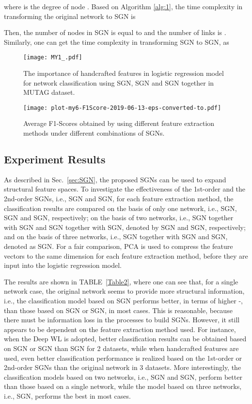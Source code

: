 \documentclass[10pt,journal,compsoc]{IEEEtran}
\begin{document}
where  is the degree of node . Based on Algorithm \ref{alg:1}, the time complexity in transforming the original network to SGN is

Then, the number of nodes in SGN is equal to  and the number of links is  \cite{harary1960some}. Similarly, one can get the time complexity in transforming SGN to SGN, as


\begin{figure*}[!t]
  \centering
  \texttt{[image: MY1\_.pdf]}
  \caption{The importance of handcrafted features in logistic regression model for network classification using SGN, SGN and SGN together in MUTAG dataset.}
  \label{featureout}
\end{figure*}

\begin{figure*}[!t]
  \centering
  \texttt{[image: plot-my6-F1Score-2019-06-13-eps-converted-to.pdf]}
  \caption{Average F1-Scores obtained by using different feature extraction methods under different combinations of SGNs.}
  \label{fig:exps}
\end{figure*}


\subsection{Experiment Results}
As described in Sec.~\ref{sec:SGN}, the proposed SGNs can be used to expand structural feature spaces. To investigate the effectiveness of the 1st-order and the 2nd-order SGNs, i.e., SGN and SGN, for each feature extraction method, the classification results are compared on the basis of only one network, i.e., SGN, SGN and SGN, respectively; on the basis of two networks, i.e., SGN together with SGN and SGN together with SGN, denoted by SGN and SGN, respectively; and on the basis of three networks, i.e., SGN together with SGN and SGN, denoted as SGN. For a fair comparison, PCA is used to compress the feature vectors to the same dimension for each feature extraction method, before they are input into the logistic regression model.

The results are shown in TABLE~\ref{Table2}, where one can see that, for a single network case, the original network seems to provide more structural information, i.e., the classification model based on SGN performs better, in terms of higher -, than those based on SGN or SGN, in most cases. This is reasonable, because there must be information loss in the processes to build SGNs. However, it still appears to be dependent on the feature extraction method used. For instance, when the Deep WL is adopted, better classification results can be obtained based on SGN or SGN than SGN for 2 datasets, while when handcrafted features are used, even better classification performance is realized based on the 1st-order or 2nd-order SGNs than the original network in 3 datasets. More interestingly, the classification models based on two networks, i.e., SGN and SGN, perform better than those based on a single network, while the model based on three networks, i.e., SGN, performs the best in most cases.
\end{document}
